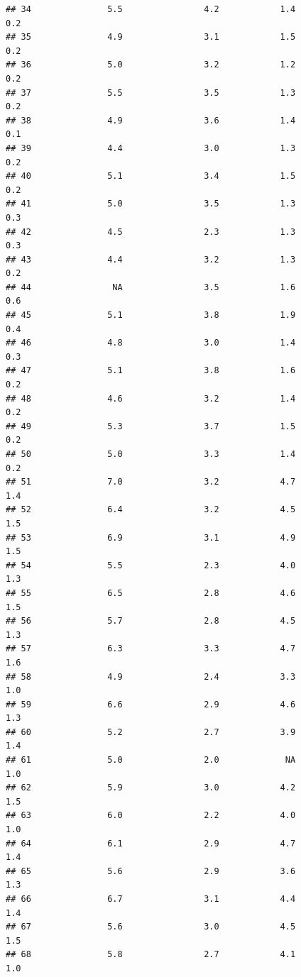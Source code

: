 \documentclass[
]{book}
\theoremstyle{plain}
\theoremstyle{definition}
\theoremstyle{definition}
\theoremstyle{definition}
\theoremstyle{definition}
\theoremstyle{definition}
\theoremstyle{remark}
\begin{document}
\begin{verbatim}
## 34               5.5                4.2            1.4              0.2
## 35               4.9                3.1            1.5              0.2
## 36               5.0                3.2            1.2              0.2
## 37               5.5                3.5            1.3              0.2
## 38               4.9                3.6            1.4              0.1
## 39               4.4                3.0            1.3              0.2
## 40               5.1                3.4            1.5              0.2
## 41               5.0                3.5            1.3              0.3
## 42               4.5                2.3            1.3              0.3
## 43               4.4                3.2            1.3              0.2
## 44                NA                3.5            1.6              0.6
## 45               5.1                3.8            1.9              0.4
## 46               4.8                3.0            1.4              0.3
## 47               5.1                3.8            1.6              0.2
## 48               4.6                3.2            1.4              0.2
## 49               5.3                3.7            1.5              0.2
## 50               5.0                3.3            1.4              0.2
## 51               7.0                3.2            4.7              1.4
## 52               6.4                3.2            4.5              1.5
## 53               6.9                3.1            4.9              1.5
## 54               5.5                2.3            4.0              1.3
## 55               6.5                2.8            4.6              1.5
## 56               5.7                2.8            4.5              1.3
## 57               6.3                3.3            4.7              1.6
## 58               4.9                2.4            3.3              1.0
## 59               6.6                2.9            4.6              1.3
## 60               5.2                2.7            3.9              1.4
## 61               5.0                2.0             NA              1.0
## 62               5.9                3.0            4.2              1.5
## 63               6.0                2.2            4.0              1.0
## 64               6.1                2.9            4.7              1.4
## 65               5.6                2.9            3.6              1.3
## 66               6.7                3.1            4.4              1.4
## 67               5.6                3.0            4.5              1.5
## 68               5.8                2.7            4.1              1.0

\end{verbatim}
\end{document}
